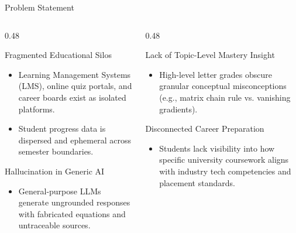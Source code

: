 \documentclass[aspectratio=169,10pt]{beamer}
\begin{document}
\begin{frame}{Problem Statement}
  \begin{columns}[T]
    \begin{column}{0.48\textwidth}
      \begin{alertblock}{Fragmented Educational Silos}
        \begin{itemize}
          \item Learning Management Systems (LMS), online quiz portals, and career boards exist as isolated platforms.
          \item Student progress data is dispersed and ephemeral across semester boundaries.
        \end{itemize}
      \end{alertblock}
      \begin{alertblock}{Hallucination in Generic AI}
        \begin{itemize}
          \item General-purpose LLMs generate ungrounded responses with fabricated equations and untraceable sources.
        \end{itemize}
      \end{alertblock}
    \end{column}
    \begin{column}{0.48\textwidth}
      \begin{alertblock}{Lack of Topic-Level Mastery Insight}
        \begin{itemize}
          \item High-level letter grades obscure granular conceptual misconceptions (e.g., matrix chain rule vs. vanishing gradients).
        \end{itemize}
      \end{alertblock}
      \begin{alertblock}{Disconnected Career Preparation}
        \begin{itemize}
          \item Students lack visibility into how specific university coursework aligns with industry tech competencies and placement standards.
        \end{itemize}
      \end{alertblock}
    \end{column}
  \end{columns}
\end{frame}
\end{document}
